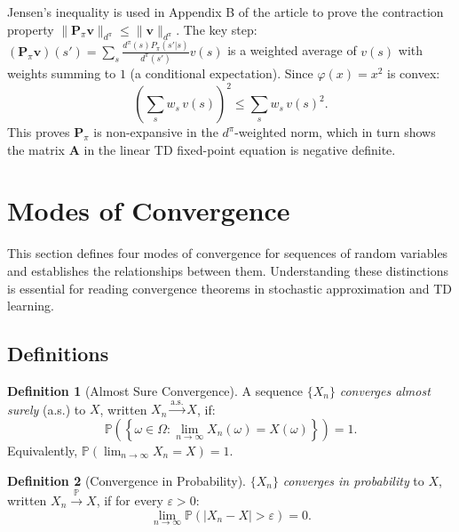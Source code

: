 \documentclass[11pt,a4paper]{article}
\theoremstyle{definition}
\newtheorem{definition}{Definition}[section]
\theoremstyle{plain}
\theoremstyle{remark}
\newcommand{\Prob}{\mathbb{P}}
\newcommand{\cas}{\xrightarrow{\text{a.s.}}}
\newcommand{\cprob}{\xrightarrow{\Prob}}
\begin{document}
\begin{tdconnection}
Jensen's inequality is used in Appendix B of the article to prove the contraction property $\|\mathbf{P}_\pi \mathbf{v}\|_{d^\pi} \leq \|\mathbf{v}\|_{d^\pi}$. The key step: $(\mathbf{P}_\pi \mathbf{v})(s') = \sum_s \frac{d^\pi(s) P_\pi(s'|s)}{d^\pi(s')} v(s)$ is a weighted average of $v(s)$ with weights summing to $1$ (a conditional expectation). Since $\varphi(x) = x^2$ is convex:
\[
    \left(\sum_s w_s\, v(s)\right)^2 \leq \sum_s w_s\, v(s)^2.
\]
This proves $\mathbf{P}_\pi$ is non-expansive in the $d^\pi$-weighted norm, which in turn shows the matrix $\mathbf{A}$ in the linear TD fixed-point equation is negative definite.
\end{tdconnection}

\section{Modes of Convergence}
\label{sec:convergence}

This section defines four modes of convergence for sequences of random variables and establishes the relationships between them. Understanding these distinctions is essential for reading convergence theorems in stochastic approximation and TD learning.

\subsection{Definitions}
\label{subsec:conv_def}

\begin{definition}[Almost Sure Convergence]
\label{def:as_conv}
A sequence $\{X_n\}$ \emph{converges almost surely} (a.s.) to $X$, written $X_n \cas X$, if:
\begin{equation}
    \Prob\!\left(\left\{\omega \in \Omega : \lim_{n \to \infty} X_n(\omega) = X(\omega)\right\}\right) = 1.
    \label{eq:as_conv}
\end{equation}
Equivalently, $\Prob\!\left(\lim_{n \to \infty} X_n = X\right) = 1$.
\end{definition}

\begin{definition}[Convergence in Probability]
\label{def:prob_conv}
$\{X_n\}$ \emph{converges in probability} to $X$, written $X_n \cprob X$, if for every $\varepsilon > 0$:
\begin{equation}
    \lim_{n \to \infty} \Prob(|X_n - X| > \varepsilon) = 0.
    \label{eq:prob_conv}
\end{equation}
\end{definition}
\end{document}
